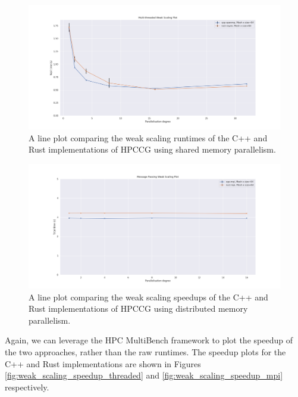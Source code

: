 \begin{figure}[H]
    \centering
    \includegraphics[width=\textwidth]{images/5_performance/scaling/weak_scaling_threaded.png}
    \caption{A line plot comparing the weak scaling runtimes of the C++ and Rust implementations of HPCCG using shared memory parallelism.}
    \label{fig:weak_scaling_threaded}
\end{figure}

\begin{figure}[H]
    \centering
    \includegraphics[width=\textwidth]{images/5_performance/scaling/weak_scaling_mpi.png}
    \caption{A line plot comparing the weak scaling speedups of the C++ and Rust implementations of HPCCG using distributed memory parallelism.}
    \label{fig:weak_scaling_mpi}
\end{figure}

Again, we can leverage the HPC MultiBench framework to plot the speedup of the two approaches, rather than the raw runtimes. The speedup plots for the C++ and Rust implementations are shown in Figures \ref{fig:weak_scaling_speedup_threaded} and \ref{fig:weak_scaling_speedup_mpi} respectively.

